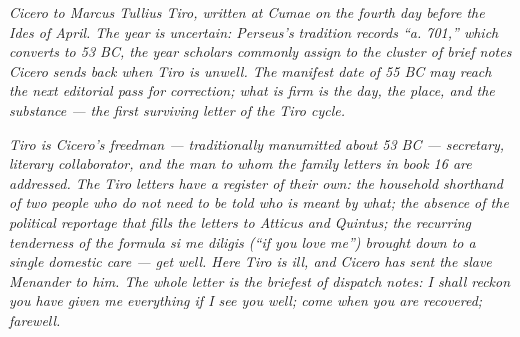 
\textit{Cicero to Marcus Tullius Tiro, written at Cumae on the
fourth day before the Ides of April. The year is uncertain:
Perseus's tradition records ``a. 701,'' which converts to 53
BC, the year scholars commonly assign to the cluster of brief
notes Cicero sends back when Tiro is unwell. The manifest
date of 55 BC may reach the next editorial pass for
correction; what is firm is the day, the place, and the
substance --- the first surviving letter of the Tiro cycle.}

\textit{Tiro is Cicero's freedman --- traditionally manumitted
about 53 BC --- secretary, literary collaborator, and the man
to whom the family letters in book 16 are addressed. The
Tiro letters have a register of their own: the household
shorthand of two people who do not need to be told who is
meant by what; the absence of the political reportage that
fills the letters to Atticus and Quintus; the recurring
tenderness of the formula \textit{si me diligis} (``if you
love me'') brought down to a single domestic care --- get
well. Here Tiro is ill, and Cicero has sent the slave
Menander to him. The whole letter is the briefest of dispatch
notes: I shall reckon you have given me everything if I see
you well; come when you are recovered; farewell.}
